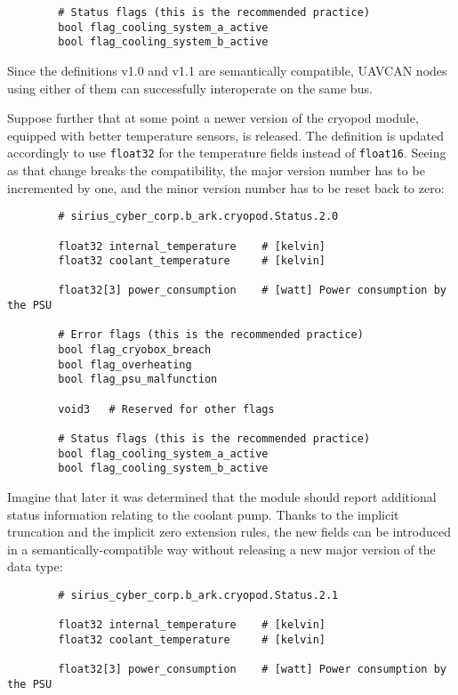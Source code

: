 \begin{remark}[breakable]
\begin{verbatim}
        # Status flags (this is the recommended practice)
        bool flag_cooling_system_a_active
        bool flag_cooling_system_b_active
    \end{verbatim}

    Since the definitions v1.0 and v1.1 are semantically compatible,
    UAVCAN nodes using either of them can successfully interoperate on the same bus.

    Suppose further that at some point a newer version of the cryopod module,
    equipped with better temperature sensors, is released.
    The definition is updated accordingly to use \verb|float32| for the temperature fields instead of \verb|float16|.
    Seeing as that change breaks the compatibility, the major version number has to be incremented by one,
    and the minor version number has to be reset back to zero:

    \begin{verbatim}
        # sirius_cyber_corp.b_ark.cryopod.Status.2.0

        float32 internal_temperature    # [kelvin]
        float32 coolant_temperature     # [kelvin]

        float32[3] power_consumption    # [watt] Power consumption by the PSU

        # Error flags (this is the recommended practice)
        bool flag_cryobox_breach
        bool flag_overheating
        bool flag_psu_malfunction

        void3   # Reserved for other flags

        # Status flags (this is the recommended practice)
        bool flag_cooling_system_a_active
        bool flag_cooling_system_b_active
    \end{verbatim}

    Imagine that later it was determined that the module should report additional status information
    relating to the coolant pump.
    Thanks to the implicit truncation and the implicit zero extension rules,
    the new fields can be introduced in a semantically-compatible way without releasing
    a new major version of the data type:

    \begin{verbatim}
        # sirius_cyber_corp.b_ark.cryopod.Status.2.1

        float32 internal_temperature    # [kelvin]
        float32 coolant_temperature     # [kelvin]

        float32[3] power_consumption    # [watt] Power consumption by the PSU


\end{verbatim}
\end{remark}
